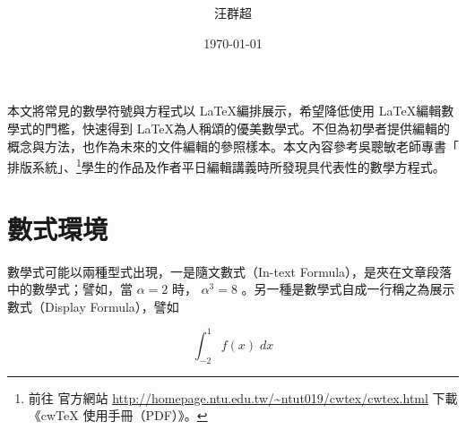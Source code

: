 \documentclass[12pt, a4paper]{article}
\title{ \deleted[id=deleted]{\LaTeX 的數學符號與方程式}\added[id=added]{文件追蹤與提醒}}
\author{{\SM 汪群超}}
\date{{\TT \today}}
\begin{document}
\maketitle
\fontsize{12}{22 pt}\selectfont
{}

本文將常見的數學符號與方程式以 \LaTeX 編排展示，希望降低使用  \LaTeX 編輯數學式的門檻，快速得到  \LaTeX 為人稱頌的優美數學式。不但為初學者提供編輯的概念與方法，也作為未來的文件編輯的參照樣本。本文內容參考吳聰敏老師專書「\cw{} 排版系統」、\footnote{前往 \cw{} 官方網站 \url{http://homepage.ntu.edu.tw/~ntut019/cwtex/cwtex.html} 下載《cwTeX 使用手冊（PDF）》。}學生的作品及作者平日編輯講義時所發現具代表性的數學方程式。

\section{數式環境}
數學式可能以兩種型式出現，一是隨文數式（In-text Formula），是夾在文章段落中的數學式；譬如，當 $\alpha=2$ 時， $\alpha^3=8$ 。另一種是數學式自成一行稱之為展示數式（Display Formula），譬如

$$\int_{-2}^{1} f(x)\;dx$$
\end{document}
